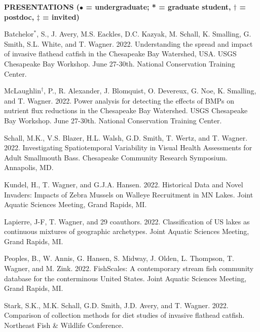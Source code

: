 \documentclass[10pt]{article}
\begin{document}
\begin{flushleft}
\vspace{8pt}
\centerline {\bf{PRESENTATIONS ({\small $\bullet$ = undergraduate; * = graduate student, $\dagger$ = postdoc, $\ddagger$ = invited})}}
\vspace{5pt}
\begin{etaremune}
	
\item Batchelor$^*$, S., J. Avery, M.S. Eackles, D.C. Kazyak, M. Schall, K. Smalling, G. Smith, S.L. White, and T. Wagner. 2022. Understanding the spread and impact of invasive flathead catfish in the Chesapeake Bay Watershed, USA. USGS Chesapeake Bay Workshop. June 27-30th. National Conservation Training Center.

\item McLaughlin$^\dagger$, P., R. Alexander, J. Blomquist, O. Devereux, G. Noe, K. Smalling, and T. Wagner. 2022. Power analysis for detecting the effects of BMPs on nutrient flux reductions in the Chesapeake Bay Watershed. USGS Chesapeake Bay Workshop. June 27-30th. National Conservation Training Center.

\item Schall, M.K., V.S. Blazer, H.L. Walsh, G.D. Smith, T. Wertz, and T. Wagner. 2022. Investigating Spatiotemporal Variability in Visual Health Assessments for Adult Smallmouth Bass. Chesapeake Community Research Symposium. Annapolis, MD.

\item Kundel, H., T. Wagner, and G.J.A. Hansen. 2022. Historical Data and Novel Invaders: Impacts of Zebra Mussels on Walleye Recruitment in MN Lakes. Joint Aquatic Sciences Meeting, Grand Rapids, MI.

\item Lapierre, J-F, T. Wagner, and 29 coauthors. 2022. Classification of US lakes as continuous mixtures of geographic archetypes. Joint Aquatic Sciences Meeting, Grand Rapids, MI.

\item Peoples, B., W. Annis, G. Hansen, S. Midway, J. Olden, L. Thompson, T. Wagner, and M. Zink. 2022. FishScales: A contemporary stream fish community database for the conterminous United States. Joint Aquatic Sciences Meeting, Grand Rapids, MI.

\item Stark, S.K., M.K. Schall, G.D. Smith, J.D. Avery, and T. Wagner. 2022. Comparison of collection methods for diet studies of invasive flathead catfish. Northeast Fish \& Wildlife Conference.


\end{etaremune}
\end{flushleft}
\end{document}
